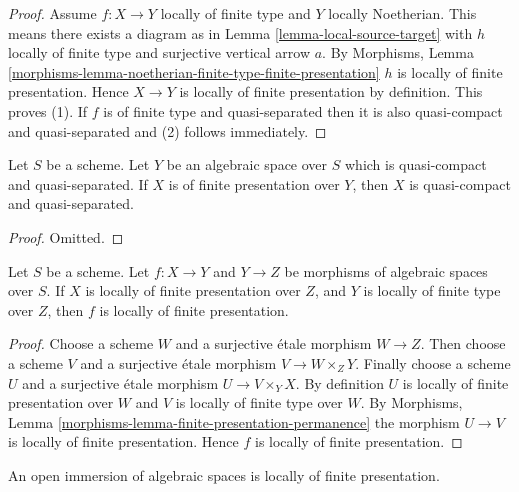 \begin{proof}
Assume $f : X \to Y$ locally of finite type and $Y$ locally Noetherian.
This means there exists a diagram as in
Lemma \ref{lemma-local-source-target}
with $h$ locally of finite type and surjective vertical arrow $a$. By
Morphisms, Lemma
\ref{morphisms-lemma-noetherian-finite-type-finite-presentation}
$h$ is locally of finite presentation.
Hence $X \to Y$ is locally of finite presentation by definition.
This proves (1).
If $f$ is of finite type and quasi-separated then it is also
quasi-compact and quasi-separated and (2) follows immediately.
\end{proof}

\begin{lemma}
\label{lemma-finite-presentation-quasi-compact-quasi-separated}
Let $S$ be a scheme. Let $Y$ be an algebraic space over $S$ which is
quasi-compact and quasi-separated. If $X$ is of finite presentation over
$Y$, then $X$ is quasi-compact and quasi-separated.
\end{lemma}

\begin{proof}
Omitted.
\end{proof}

\begin{lemma}
\label{lemma-finite-presentation-permanence}
Let $S$ be a scheme.
Let $f : X \to Y$ and $Y \to Z$ be morphisms of algebraic spaces over $S$.
If $X$ is locally of finite presentation over $Z$, and
$Y$ is locally of finite type over $Z$, then $f$ is locally
of finite presentation.
\end{lemma}

\begin{proof}
Choose a scheme $W$ and a surjective \'etale morphism $W \to Z$.
Then choose a scheme $V$ and a surjective \'etale morphism $V \to W \times_Z Y$.
Finally choose a scheme $U$ and a surjective \'etale morphism
$U \to V \times_Y X$. By definition $U$ is locally of finite presentation
over $W$ and $V$ is locally of finite type over $W$. By
Morphisms, Lemma \ref{morphisms-lemma-finite-presentation-permanence}
the morphism $U \to V$ is locally of finite presentation.
Hence $f$ is locally of finite presentation.
\end{proof}

\begin{lemma}
\label{lemma-open-immersion-locally-finite-presentation}
An open immersion of algebraic spaces is locally of finite presentation.
\end{lemma}

